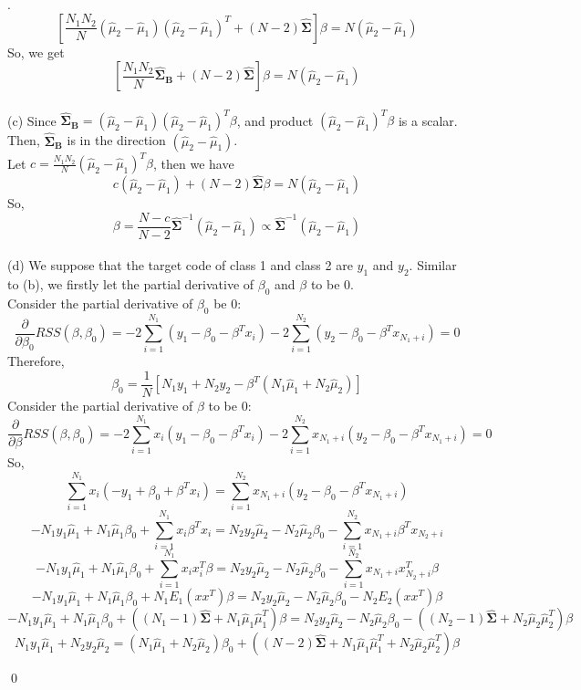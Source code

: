 \documentclass[12pt]{article}
\newenvironment{sol}
  {\par\vspace{3mm}\noindent{\it Solution}.}
  {\qed}
\begin{document}
\begin{sol}
$$\left[\frac{N_1N_2}{N}(\hat{\mu}_2-\hat{\mu}_1)(\hat{\mu}_2-\hat{\mu}_1)^T+(N-2)\hat{\mathbf{\Sigma}}\right]\beta=N(\hat{\mu}_2-\hat{\mu}_1)$$
So, we get
$$\left[\frac{N_1N_2}{N}\hat{\mathbf\Sigma}_{\mathbf{B}}+(N-2)\hat{\mathbf{\Sigma}}\right]\beta=N(\hat{\mu}_2-\hat{\mu}_1)$$
\\
(c) Since $\hat{\mathbf\Sigma}_{\mathbf{B}}=(\hat{\mu}_2-\hat{\mu}_1)(\hat{\mu}_2-\hat{\mu}_1)^T\beta$, and product $(\hat{\mu}_2-\hat{\mu}_1)^T\beta$ is a scalar. Then,
$\hat{\mathbf\Sigma}_{\mathbf{B}}$ is in the direction $(\hat{\mu}_2-\hat{\mu}_1)$.\\
Let $c=\frac{N_1N_2}{N}(\hat{\mu}_2-\hat{\mu}_1)^T\beta$, then we have
$$c(\hat{\mu}_2-\hat{\mu}_1)+(N-2)\hat{\mathbf{\Sigma}}\beta=N(\hat{\mu}_2-\hat{\mu}_1)$$
So,
$$\beta=\frac{N-c}{N-2}\hat{\mathbf{\Sigma}}^{-1}(\hat{\mu}_2-\hat{\mu}_1)\propto\hat{\mathbf{\Sigma}}^{-1}(\hat{\mu}_2-\hat{\mu}_1)$$
\\
(d) We suppose that the target code of class 1 and class 2 are $y_1$ and $y_2$. Similar to (b), we firstly let the partial derivative of $\beta_0$ and $\beta$ to be 0.\\
Consider the partial derivative of $\beta_0$ be 0:
$$\frac{\partial}{\partial\beta_0}RSS(\beta,\beta_0) = -2\sum_{i=1}^{N_1}(y_1-\beta_0-\beta^{T}x_i)
-2\sum_{i=1}^{N_2}(y_2-\beta_0-\beta^Tx_{N_1+i})=0$$
Therefore,
$$\beta_0=\frac{1}{N}[N_1y_1+N_2y_2-\beta^T(N_1\hat{\mu}_1+N_2\hat{\mu}_2)]$$
Consider the partial derivative of $\beta$ to be 0:
$$\frac{\partial}{\partial\beta}RSS(\beta,\beta_0) = -2\sum_{i=1}^{N_1}x_i(y_1-\beta_0-\beta^{T}x_i)
-2\sum_{i=1}^{N_2}x_{N_1+i}(y_2-\beta_0-\beta^Tx_{N_1+i})=0$$
So,
$$\sum_{i=1}^{N_1}x_i(-y_1+\beta_0+\beta^{T}x_i) = \sum_{i=1}^{N_2}x_{N_1+i}(y_2-\beta_0-\beta^Tx_{N_1+i})$$
$$-N_1y_1\hat{\mu}_1+N_1\hat{\mu}_1\beta_0+\sum_{i=1}^{N_1}x_i\beta^{T}x_i = N_2y_2\hat{\mu}_2-N_2\hat{\mu}_2\beta_0-\sum_{i=1}^{N_2}x_{N_1+i}\beta^{T}x_{N_2+i}$$
$$-N_1y_1\hat{\mu}_1+N_1\hat{\mu}_1\beta_0+\sum_{i=1}^{N_1}x_ix_i^T\beta = N_2y_2\hat{\mu}_2-N_2\hat{\mu}_2\beta_0-\sum_{i=1}^{N_2}x_{N_1+i}x_{N_2+i}^T\beta$$
$$-N_1y_1\hat{\mu}_1+N_1\hat{\mu}_1\beta_0+N_1E_1(xx^T)\beta = N_2y_2\hat{\mu}_2-N_2\hat{\mu}_2\beta_0-N_2E_2(xx^T)\beta$$
$$-N_1y_1\hat{\mu}_1+N_1\hat{\mu}_1\beta_0+((N_1-1)\hat{\mathbf{\Sigma}}+N_1\hat{\mu}_1\hat{\mu}_1^T)\beta = N_2y_2\hat{\mu}_2-N_2\hat{\mu}_2\beta_0-((N_2-1)\hat{\mathbf{\Sigma}}+N_2\hat{\mu}_2\hat{\mu}_2^T)\beta$$
$$N_1y_1\hat{\mu}_1+N_2y_2\hat{\mu}_2=(N_1\hat{\mu}_1+N_2\hat{\mu}_2)\beta_0+((N-2)\hat{\mathbf{\Sigma}}+N_1\hat{\mu}_1\hat{\mu}_1^T+N_2\hat{\mu}_2\hat{\mu}_2^T)\beta$$

\end{sol}
\end{document}

